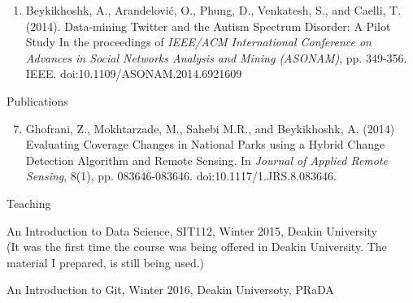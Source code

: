 \documentclass[10pt,letterpaper]{article}
\renewenvironment{itemize}{
  \begin{list}{}{
    \setlength{\leftmargin}{1.5em}
    \setlength{\itemsep}{0.25em}
    \setlength{\parskip}{0pt}
    \setlength{\parsep}{0.25em}
  }
}{
  \end{list}
}
\begin{document}
\begin{minipage}[t]{0.795\textwidth}
\begin{enumerate}
\item Beykikhoshk, A., Arandelovi{\'c}, O., Phung, D., Venkatesh, S., and Caelli, T. (2014). Data-mining 
Twitter and the Autism Spectrum Disorder: A Pilot Study In the proceedings of \textit{IEEE/ACM International 
Conference on Advances in Social Networks Analysis and Mining (ASONAM)}, pp. 349-356. IEEE.  doi:10.1109/ASONAM.2014.6921609 
\end{enumerate}
\end{minipage}


\begin{minipage}[t]{0.195\textwidth}
Publications 
\end{minipage}
\begin{minipage}[t]{0.795\textwidth}
\begin{enumerate}
\setcounter{enumi}{6}

\item Ghofrani, Z., Mokhtarzade, M., Sahebi M.R., and Beykikhoshk, A. (2014) Evaluating Coverage Changes in National 
Parks using a Hybrid Change Detection Algorithm and Remote Sensing. In \textit{Journal of Applied Remote Sensing}, 8(1), pp. 083646-083646. doi:10.1117/1.JRS.8.083646. 
\end{enumerate}
\end{minipage}

\bigskip
\bigskip

\begin{minipage}[t]{0.195\textwidth}
Teaching 
\end{minipage}
\begin{minipage}[t]{0.795\textwidth}
\begin{itemize}
\item An Introduction to Data Science, SIT112, Winter 2015, Deakin University \\
(It was the first time the course was being offered in Deakin University. The material I prepared, is still being used.)
\item An Introduction to Git, Winter 2016, Deakin Universoty, PRaDA
\end{itemize}
\end{minipage}


\bigskip
\bigskip
\end{document}
